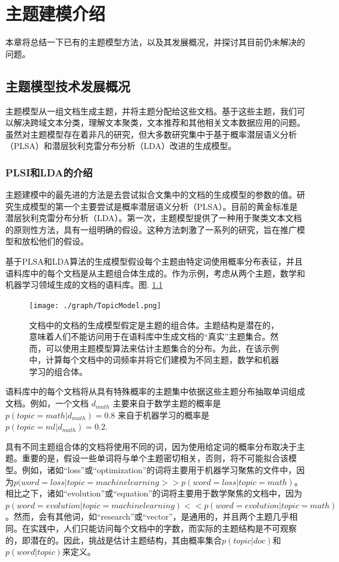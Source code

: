 
\chapter{主题建模介绍}
本章将总结一下已有的主题模型方法，以及其发展概况，并探讨其目前仍未解决的问题。
\section{主题模型技术发展概况}
主题模型从一组文档生成主题，并将主题分配给这些文档。基于这些主题，我们可以解决跨域文本分类\cite{Barathi}，理解文本聚类\cite{TopicClust}，文本推荐和其他相关文本数据应用的问题。虽然对主题模型存在着非凡的研究，但大多数研究集中于基于概率潜层语义分析（PLSA）\cite{PLSI}和潜层狄利克雷分布分析（LDA）\cite{LDA}改进的生成模型。
\subsection{PLSI和LDA的介绍}
主题建模中的最先进的方法是去尝试拟合文集中的文档的生成模型的参数的值。研究生成模型的第一个主要尝试是概率潜层语义分析（PLSA）\cite{PLSI}。目前的黄金标准是潜层狄利克雷分布分析（LDA）\cite{LDA}。第一次，主题模型提供了一种用于聚类文本文档的原则性方法，具有一组明确的假设。这种方法刺激了一系列的研究，旨在推广模型和放松他们的假设。

基于PLSA和LDA算法的生成模型假设每个主题由特定词使用概率分布表征，并且语料库中的每个文档是从主题组合体生成的。作为示例，考虑从两个主题，数学和机器学习领域生成的文档的语料库。图. \ref{fig:TopicModelDoc} 
 \begin{figure}[!h]
\centering
  \texttt{[image: ./graph/TopicModel.png]}\\
  \caption{文档中的文档的生成模型假定是主题的组合体。主题结构是潜在的，意味着人们不能访问用于在语料库中生成文档的“真实”主题集合。然而，可以使用主题模型算法来估计主题集合的分布。为此，在该示例中，计算每个文档中的词频率并将它们建模为不同主题，数学和机器学习的组合体。}\label{fig:TopicModelDoc}
\end{figure}
语料库中的每个文档将从具有特殊概率的主题集中依据这些主题分布抽取单词组成文档。例如，一个文档 $d_{math}$ 主要来自于数学主题的概率是$p(topic = math|d_{math}) = 0.8$ 来自于机器学习的概率是$p(topic = ml|d_{math}) = 0.2$.

具有不同主题组合体的文档将使用不同的词，因为使用给定词的概率分布取决于主题。重要的是，假设一些单词将与单个主题密切相关，否则，将不可能拟合该模型。例如，诸如“loss”或“optimization”的词将主要用于机器学习聚焦的文件中，因为$p(word = loss|topic = machine learning >> p(word = loss|topic = math)$。相比之下，诸如“evolution”或“equation”的词将主要用于数学聚焦的文档中，因为$p(word = evolution|topic = machine learning) << p(word = evolution|topic = math)$。然而，会有其他词，如“research”或“vector”，是通用的，并且两个主题几乎相同。在实践中，人们只能访问每个文档中的字数，而实际的主题结构是不可观察的，即潜在的。因此，挑战是估计主题结构，其由概率集合$p(topic|doc)$和$p(word|topic)$来定义。

